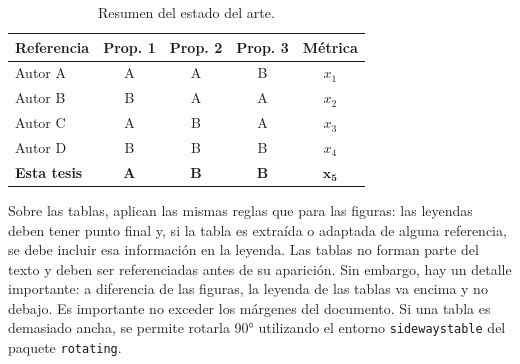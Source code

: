 \begin{table}[h]
    \centering
    \caption{Resumen del estado del arte. \label{tab:SoTA}}
    \begin{tabular}{|l|c|c|c|c|}
        \hline
        \textbf{Referencia} & \textbf{Prop. 1} & \textbf{Prop. 2} & \textbf{Prop. 3} & \textbf{Métrica} \\
        \hline
        Autor A \cite{Shannon1948} & A & A & B & $x_1$ \\
        Autor B \cite{berrou1993} & B & A & A & $x_2$ \\
        Autor C \cite{haykin2001} & A & B & A & $x_3$ \\
        Autor D \cite{ieee80211_2020} & B & B & B & $x_4$ \\
        \hline
        \textbf{Esta tesis}        & \textbf{A} & \textbf{B} & \textbf{B} & $\mathbf{x_5}$ \\
        \hline
    \end{tabular}
\end{table}

Sobre las tablas, aplican las mismas reglas que para las figuras: las leyendas deben tener punto final y, si la tabla es extraída o adaptada de alguna referencia, se debe incluir esa información en la leyenda. Las tablas no forman parte del texto y deben ser referenciadas antes de su aparición. Sin embargo, hay un detalle importante: a diferencia de las figuras, la leyenda de las tablas va encima y no debajo. Es importante no exceder los márgenes del documento. Si una tabla es demasiado ancha, se permite rotarla 90° utilizando el entorno \texttt{sidewaystable} del paquete \texttt{rotating}.